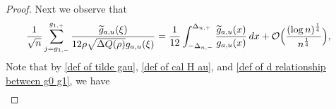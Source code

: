 \documentclass[reqno]{amsart}
\newcommand{\1}{\mathds{1}}
\numberwithin{equation}{section}
\theoremstyle{definition}
\begin{document}
\begin{proof}

Next we observe that 
\begin{align*}
\frac{1}{\sqrt{n}} \sum_{j=g_{1,-}}^{g_{1,+}}
\frac{\widetilde{g}_{a,u}(\xi)}{12\rho\sqrt{\Delta Q(\rho)}g_{a,u}(\xi)}
&=
\frac{1}{12}\int_{-\Delta_{n,-}}^{\Delta_{n,+}}
\frac{\widetilde{g}_{a,u}(x)}{g_{a,u}(x)}\,dx
+\mathcal{O}\Bigl(\frac{(\log n)^{\frac{1}{4}}}{n^{\frac{1}{4}}}\Bigr),
\end{align*}
Note that by \eqref{def of tilde gau}, \eqref{def of cal H au}, and \eqref{def of d relationship between g0 g1}, we have 
\begin{align*}

\end{align*}
\end{proof}
\end{document}
